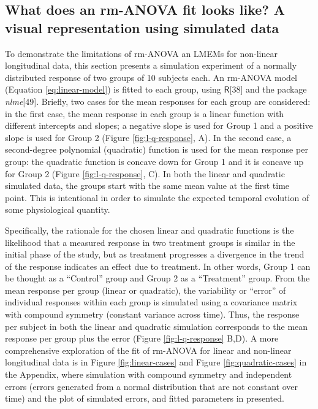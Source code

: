 \documentclass[
]{article}
\begin{document}
\hypertarget{simulation}{%
\subsection{What does an rm-ANOVA fit looks like? A visual representation using simulated data}\label{simulation}}

To demonstrate the limitations of rm-ANOVA an LMEMs for non-linear longitudinal data, this section presents a simulation experiment of a normally distributed response of two groups of 10 subjects each. An rm-ANOVA model (Equation \eqref{eq:linear-model}) is fitted to each group, using \(\textsf{R}\){[}38{]} and the package \emph{nlme}{[}49{]}.
Briefly, two cases for the mean responses for each group are considered: in the first case, the mean response in each group is a linear function with different intercepts and slopes; a negative slope is used for Group 1 and a positive slope is used for Group 2 (Figure \ref{fig:l-q-response}, A). In the second case, a second-degree polynomial (quadratic) function is used for the mean response per group: the quadratic function is concave down for Group 1 and it is concave up for Group 2 (Figure \ref{fig:l-q-response}, C). In both the linear and quadratic simulated data, the groups start with the same mean value at the first time point. This is intentional in order to simulate the expected temporal evolution of some physiological quantity.

Specifically, the rationale for the chosen linear and quadratic functions is the likelihood that a measured response in two treatment groups is similar in the initial phase of the study, but as treatment progresses a divergence in the trend of the response indicates an effect due to treatment. In other words, Group 1 can be thought as a ``Control'' group and Group 2 as a ``Treatment'' group. From the mean response per group (linear or quadratic), the variability or ``error'' of individual responses within each group is simulated using a covariance matrix with compound symmetry (constant variance across time). Thus, the response per subject in both the linear and quadratic simulation corresponds to the mean response per group plus the error (Figure \ref{fig:l-q-response} B,D). A more comprehensive exploration of the fit of rm-ANOVA for linear and non-linear longitudinal data is in Figure \ref{fig:linear-cases} and Figure \ref{fig:quadratic-cases} in the Appendix, where simulation with compound symmetry and independent errors (errors generated from a normal distribution that are not constant over time) and the plot of simulated errors, and fitted parameters in presented.
\end{document}
